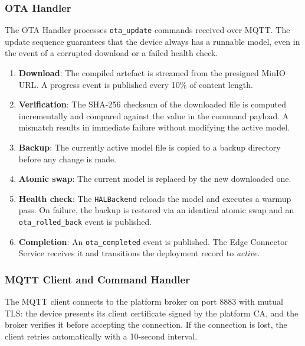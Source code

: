\subsubsection{\texorpdfstring{\acrshort{OTA}}{OTA} Handler}\label{sec:impl:ota}

The \gls{OTA} Handler processes \texttt{ota\_update} commands received over \gls{MQTT}. The update sequence guarantees that the device always has a runnable model, even in the event of a corrupted download or a failed health check.

\begin{enumerate}
    \item \textbf{Download}: The compiled artefact is streamed from the presigned MinIO \gls{URL}. A progress event is published every 10\% of content length.
    \item \textbf{Verification}: The SHA-256 checksum of the downloaded file is computed incrementally and compared against the value in the command payload. A mismatch results in immediate failure without modifying the active model.
    \item \textbf{Backup}: The currently active model file is copied to a backup directory before any change is made.
    \item \textbf{Atomic swap}: The current model is replaced by the new downloaded one.
    \item \textbf{Health check}: The \texttt{\gls{HAL}Backend} reloads the model and executes a warmup pass. On failure, the backup is restored via an identical atomic swap and an \texttt{ota\_rolled\_back} event is published.
    \item \textbf{Completion}: An \texttt{ota\_completed} event is published. The Edge Connector Service receives it and transitions the deployment record to \textit{active}.
\end{enumerate}


\subsubsection{\texorpdfstring{\acrshort{MQTT}}{MQTT} Client and Command Handler}\label{sec:impl:mqtt_edge}

The \gls{MQTT} client connects to the platform broker on port 8883 with mutual \gls{TLS}: the device presents its client certificate signed by the platform \gls{CA}, and the broker verifies it before accepting the connection. If the connection is lost, the client retries automatically with a 10-second interval.


